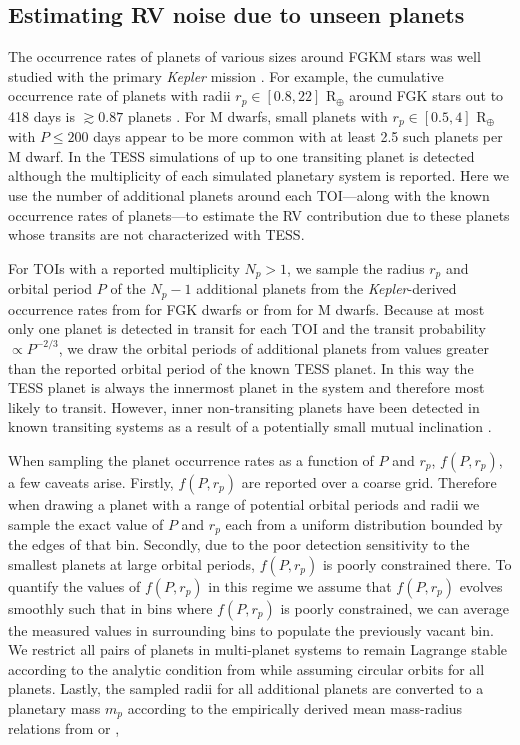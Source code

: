 \subsection{Estimating RV noise due to unseen planets} \label{RVFCsect:planets}
The occurrence rates of planets of various sizes around FGKM stars was well studied with the primary
\emph{Kepler} mission \citep[e.g.][]{fressin13, dressing15a}. For example, the cumulative occurrence rate of planets with
radii $r_p \in [0.8,22]$ R$_{\oplus}$ around FGK stars out to 418 days is $\gtrsim 0.87$ planets \citep{fressin13}.
For M dwarfs, small planets with $r_p \in [0.5,4]$ R$_{\oplus}$ with $P \leq 200$ days appear to be more common with
at least 2.5 such planets per
M dwarf. In the TESS simulations of  up to one transiting planet is detected although the
multiplicity of each simulated planetary system is reported.
Here we use the number of additional planets around each TOI---along with the known occurrence rates of
planets---to estimate the RV contribution due to these planets whose transits
are not characterized with TESS.

For TOIs with a reported multiplicity $N_p>1$, we sample the radius $r_p$ and orbital period $P$ of the $N_p-1$
additional planets from the \emph{Kepler}-derived occurrence rates from \cite{fressin13} for FGK dwarfs or from
\cite{dressing15a} for M dwarfs. Because at most only one planet is detected in transit for each TOI and the
transit probability $\propto P^{-2/3}$, we draw the orbital periods of additional planets from values greater than
the reported orbital period of the known TESS planet.
In this way the TESS planet is always the innermost planet in the system and therefore most likely to transit.
However, inner non-transiting planets have been detected in known transiting systems
as a result of a potentially small mutual inclination \citep[$\Delta i \sim 1^{\circ}$;][]{cloutier17b}.

When sampling the planet occurrence rates as a function of $P$ and $r_p$, $f(P,r_p)$, a few caveats arise. Firstly,
$f(P,r_p)$ are reported over a coarse grid. Therefore when drawing a planet with a range of potential orbital
periods and radii we sample the exact value of $P$ and $r_p$ each from a uniform distribution bounded by the edges
of that bin. Secondly, due to the poor detection sensitivity to the smallest planets at large orbital periods,
$f(P,r_p)$ is poorly constrained there. To quantify the values of $f(P,r_p)$ in this regime we assume that
$f(P,r_p)$ evolves smoothly such that in bins where $f(P,r_p)$ is poorly constrained, we can average the measured
values in surrounding bins to populate the previously vacant bin. We restrict all pairs of planets in multi-planet
systems to remain Lagrange stable according to the analytic condition from \cite{barnes06} while assuming circular
orbits for all planets. Lastly, the sampled radii for all additional planets are converted to a planetary mass
$m_p$ according to the empirically derived mean mass-radius relations from \cite{weiss13} or \cite{weiss14},

